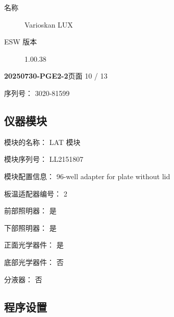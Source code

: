 \documentclass[UTF8,10pt,a4paper,fontset=fandol]{ctexart}
\newcommand{\fieldvalue}[1]{#1}
\begin{document}
\begin{center}
\begin{center}
\begin{description}
\item[名称]
\fieldvalue{Varioskan LUX}

\item[ESW 版本]
\fieldvalue{1.00.38}
\end{description}

\newpage

\noindent\textbf{20250730-PGE2-2}\hfill 页面 10 / 13

\vspace{1em}

\noindent
序列号：%
\fieldvalue{3020-81599}

\subsection*{仪器模块}

\noindent
模块的名称：%
\fieldvalue{LAT 模块}

\noindent
模块序列号：%
\fieldvalue{LL2151807}

\noindent
模块配置信息：%
\fieldvalue{96-well adapter for plate without lid}

\noindent
板温适配器编号：%
\fieldvalue{2}

\noindent
前部照明器：%
\fieldvalue{是}

\noindent
下部照明器：%
\fieldvalue{是}

\noindent
正面光学器件：%
\fieldvalue{是}

\noindent
底部光学器件：%
\fieldvalue{否}

\noindent
分液器：%
\fieldvalue{否}

\subsection*{程序设置}


\end{center}
\end{center}
\end{document}
